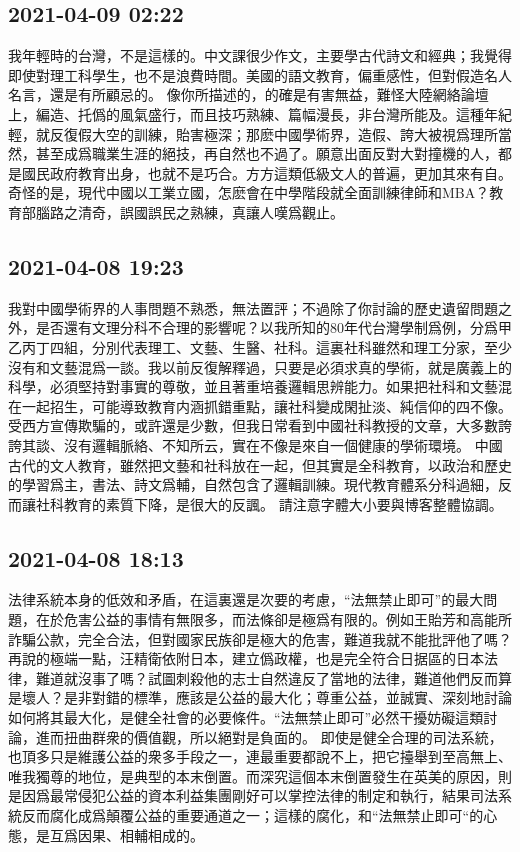 \documentclass[twocolumn]{ctexart}
\begin{document}
\subsection*{2021-04-09 02:22}

我年輕時的台灣，不是這樣的。中文課很少作文，主要學古代詩文和經典；我覺得即使對理工科學生，也不是浪費時間。美國的語文教育，偏重感性，但對假造名人名言，還是有所顧忌的。
像你所描述的，的確是有害無益，難怪大陸網絡論壇上，編造、托僞的風氣盛行，而且技巧熟練、篇幅漫長，非台灣所能及。這種年紀輕，就反復假大空的訓練，貽害極深；那麽中國學術界，造假、誇大被視爲理所當然，甚至成爲職業生涯的絕技，再自然也不過了。願意出面反對大對撞機的人，都是國民政府教育出身，也就不是巧合。方方這類低級文人的普遍，更加其來有自。奇怪的是，現代中國以工業立國，怎麽會在中學階段就全面訓練律師和MBA？教育部腦路之清奇，誤國誤民之熟練，真讓人嘆爲觀止。
\subsection*{2021-04-08 19:23}

我對中國學術界的人事問題不熟悉，無法置評；不過除了你討論的歷史遺留問題之外，是否還有文理分科不合理的影響呢？以我所知的80年代台灣學制爲例，分爲甲乙丙丁四組，分別代表理工、文藝、生醫、社科。這裏社科雖然和理工分家，至少沒有和文藝混爲一談。我以前反復解釋過，只要是必須求真的學術，就是廣義上的科學，必須堅持對事實的尊敬，並且著重培養邏輯思辨能力。如果把社科和文藝混在一起招生，可能導致教育内涵抓錯重點，讓社科變成閑扯淡、純信仰的四不像。受西方宣傳欺騙的，或許還是少數，但我日常看到中國社科教授的文章，大多數誇誇其談、沒有邏輯脈絡、不知所云，實在不像是來自一個健康的學術環境。
中國古代的文人教育，雖然把文藝和社科放在一起，但其實是全科教育，以政治和歷史的學習爲主，書法、詩文爲輔，自然包含了邏輯訓練。現代教育體系分科過細，反而讓社科教育的素質下降，是很大的反諷。
請注意字體大小要與博客整體協調。
\subsection*{2021-04-08 18:13}

法律系統本身的低效和矛盾，在這裏還是次要的考慮，“法無禁止即可”的最大問題，在於危害公益的事情有無限多，而法條卻是極爲有限的。例如王貽芳和高能所詐騙公款，完全合法，但對國家民族卻是極大的危害，難道我就不能批評他了嗎？再說的極端一點，汪精衛依附日本，建立僞政權，也是完全符合日据區的日本法律，難道就沒事了嗎？試圖刺殺他的志士自然違反了當地的法律，難道他們反而算是壞人？是非對錯的標準，應該是公益的最大化；尊重公益，並誠實、深刻地討論如何將其最大化，是健全社會的必要條件。“法無禁止即可”必然干擾妨礙這類討論，進而扭曲群衆的價值觀，所以絕對是負面的。
即使是健全合理的司法系統，也頂多只是維護公益的衆多手段之一，連最重要都說不上，把它擡舉到至高無上、唯我獨尊的地位，是典型的本末倒置。而深究這個本末倒置發生在英美的原因，則是因爲最常侵犯公益的資本利益集團剛好可以掌控法律的制定和執行，結果司法系統反而腐化成爲顛覆公益的重要通道之一；這樣的腐化，和“法無禁止即可“的心態，是互爲因果、相輔相成的。
\end{document}
